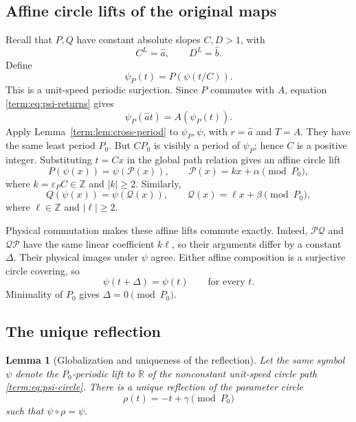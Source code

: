 \documentclass[11pt]{article}
\newtheorem{lemma}[theorem]{Lemma}
\theoremstyle{definition}
\theoremstyle{remark}
\begin{document}
\subsection{Affine circle lifts of the original maps}

Recall that \(P,Q\) have constant absolute slopes \(C,D>1\), with
\begin{equation}\label{term:eq:root-slopes}
 C^L=\widehat a,\qquad D^L=\widehat b.
\end{equation}
Define
\[
 \psi_P(t)=P(\psi(t/C)).
\]
This is a unit-speed periodic surjection.  Since \(P\) commutes with \(A\),
equation \eqref{term:eq:psi-returns} gives
\[
 \psi_P(\widehat a t)=A(\psi_P(t)).
\]
Apply Lemma~\ref{term:lem:cross-period} to \(\psi_P,\psi\), with
\(r=\widehat a\) and \(T=A\).  They have the same least period \(P_0\).  But
\(CP_0\) is visibly a period of \(\psi_P\); hence \(C\) is a positive
integer.  Substituting \(t=Cx\) in the global path relation gives an affine
circle lift
\begin{equation}\label{term:eq:P-lift}
 P(\psi(x))=\psi(\mathcal P(x)),\qquad
 \mathcal P(x)=kx+\alpha\pmod{P_0},
\end{equation}
where \(k=\varepsilon_PC\in\mathbb Z\) and \(|k|\geq2\).  Similarly,
\begin{equation}\label{term:eq:Q-lift}
 Q(\psi(x))=\psi(\mathcal Q(x)),\qquad
 \mathcal Q(x)=\ell x+\beta\pmod{P_0},
\end{equation}
where \(\ell\in\mathbb Z\) and \(|\ell|\geq2\).

Physical commutation makes these affine lifts commute exactly.  Indeed,
\(\mathcal P\mathcal Q\) and \(\mathcal Q\mathcal P\) have the same linear
coefficient \(k\ell\), so their arguments differ by a constant \(\Delta\).
Their physical images under \(\psi\) agree.  Either affine composition is a
surjective circle covering, so
\[
 \psi(t+\Delta)=\psi(t)\qquad\text{for every }t.
\]
Minimality of \(P_0\) gives \(\Delta=0\pmod{P_0}\).

\subsection{The unique reflection}

\begin{lemma}[Globalization and uniqueness of the reflection]
\label{term:lem:global-reflection}
Let the same symbol \(\psi\) denote the \(P_0\)-periodic lift to
\(\mathbb R\) of the nonconstant unit-speed circle path
\eqref{term:eq:psi-circle}.  There is a unique reflection of the parameter
circle
\[
 \rho(t)=-t+\gamma\pmod{P_0}
\]
such that \(\psi\circ\rho=\psi\).
\end{lemma}
\end{document}
